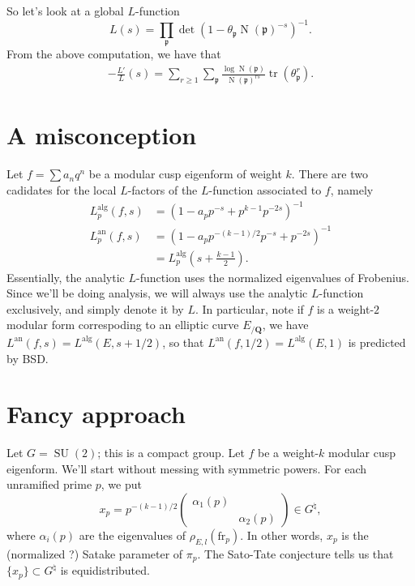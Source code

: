 \documentclass{article}
\DeclareMathOperator{\norm}{N}
\DeclareMathOperator{\SU}{SU}
\DeclareMathOperator{\trace}{tr}
\newcommand{\fp}{\mathfrak{p}}
\newcommand{\bQ}{\mathbf{Q}}
\newcommand{\an}{\mathrm{an}}
\newcommand{\alg}{\mathrm{alg}}
\newcommand{\frob}{\mathrm{fr}}
\begin{document}
So let's look at a global $L$-function
\[
	L(s) = \prod_\fp \det(1-\theta_\fp \norm(\fp)^{-s})^{-1} .
\]
From the above computation, we have that 
\begin{align*}
	-\frac{L'}{L}(s) = \sum_{r\geqslant 1} \sum_\fp \frac{\log \norm(\fp)}{\norm(\fp)^{r s}} \trace(\theta_\fp^r) .
\end{align*}





\section{A misconception}

Let $f = \sum a_n q^n$ be a modular cusp eigenform of weight $k$. There are two 
cadidates for the local $L$-factors of the $L$-function associated to $f$, 
namely 
\begin{align*}
	L_p^\alg(f,s) &= (1-a_p p^{-s} + p^{k-1} p^{-2s})^{-1} \\
	L_p^\an(f,s) &= (1-a_p p^{-(k-1)/2} p^{-s} + p^{-2s})^{-1} \\
		&= L_p^\alg\left(s+\frac{k-1}{2}\right) .
\end{align*}
Essentially, the analytic $L$-function uses the normalized eigenvalues of 
Frobenius. Since we'll be doing analysis, we will always use the analytic 
$L$-function exclusively, and simply denote it by $L$. In particular, note if 
$f$ is a weight-$2$ modular form correspoding to an elliptic curve $E_{/\bQ}$, 
we have $L^\an(f,s) = L^\alg(E,s+1/2)$, so that $L^\an(f,1/2) = L^\alg(E,1)$ is 
predicted by BSD. 





\section{Fancy approach}

Let $G=\SU(2)$; this is a compact group. Let $f$ be a weight-$k$ modular cusp 
eigenform. We'll start without messing with symmetric powers. For each 
unramified prime $p$, we put 
\[
	x_p = p^{-(k-1)/2}\begin{pmatrix} \alpha_1(p) \\ & \alpha_2(p)\end{pmatrix} \in G^\natural,
\]
where $\alpha_i(p)$ are the eigenvalues of $\rho_{E,l}(\frob_p)$. In other 
words, $x_p$ is the (normalized ?) Satake parameter of $\pi_p$. The Sato-Tate 
conjecture tells us that $\{x_p\}\subset G^\natural$ is equidistributed. 
\end{document}

